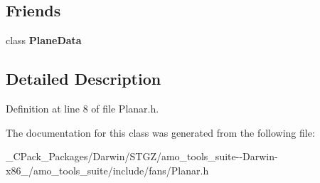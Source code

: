 \subsection*{Friends}
\begin{DoxyCompactItemize}
\item 
\mbox{\label{class_velocity_pressure_traverse_data_a31f6bbdce0894df6a817f493afffda84}} 
class {\bfseries Plane\+Data}
\end{DoxyCompactItemize}


\subsection{Detailed Description}


Definition at line 8 of file Planar.\+h.



The documentation for this class was generated from the following file\+:\begin{DoxyCompactItemize}
\item 
\+\_\+\+C\+Pack\+\_\+\+Packages/\+Darwin/\+S\+T\+G\+Z/amo\+\_\+tools\+\_\+suite-\/-\/\+Darwin-\/x86\+\_/amo\+\_\+tools\+\_\+suite/include/fans/Planar.\+h\end{DoxyCompactItemize}

